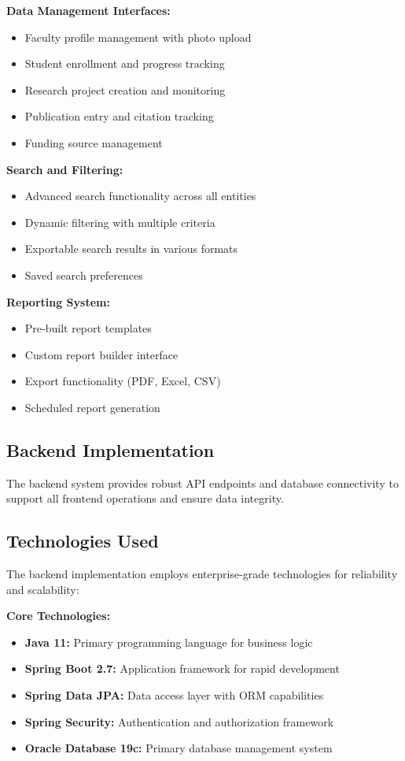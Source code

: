 \documentclass[12pt,a4paper]{article}
\begin{document}
\textbf{Data Management Interfaces:}
\begin{itemize}
    \item Faculty profile management with photo upload
    \item Student enrollment and progress tracking
    \item Research project creation and monitoring
    \item Publication entry and citation tracking
    \item Funding source management
\end{itemize}

\textbf{Search and Filtering:}
\begin{itemize}
    \item Advanced search functionality across all entities
    \item Dynamic filtering with multiple criteria
    \item Exportable search results in various formats
    \item Saved search preferences
\end{itemize}

\textbf{Reporting System:}
\begin{itemize}
    \item Pre-built report templates
    \item Custom report builder interface
    \item Export functionality (PDF, Excel, CSV)
    \item Scheduled report generation
\end{itemize}

\subsection{Backend Implementation}
The backend system provides robust API endpoints and database connectivity to support all frontend operations and ensure data integrity.

\subsection{Technologies Used}
The backend implementation employs enterprise-grade technologies for reliability and scalability:

\textbf{Core Technologies:}
\begin{itemize}
    \item \textbf{Java 11:} Primary programming language for business logic
    \item \textbf{Spring Boot 2.7:} Application framework for rapid development
    \item \textbf{Spring Data JPA:} Data access layer with ORM capabilities
    \item \textbf{Spring Security:} Authentication and authorization framework
    \item \textbf{Oracle Database 19c:} Primary database management system
\end{itemize}
\end{document}
